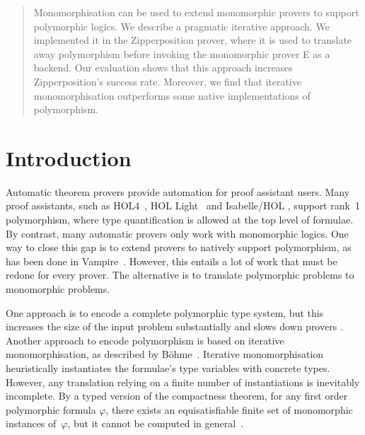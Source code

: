 \documentclass[runningheads]{llncs}
\begin{document}
\author{Tanguy Bozec \and
Jasmin Blanchette}




\maketitle

\begin{sloppy}
\begin{abstract}
Monomorphisation can be used to extend monomorphic provers to support polymorphic logics. We describe a pragmatic iterative approach. We implemented it in the Zipperposition prover, where it is used to translate away polymorphism before invoking the monomorphic prover E as a backend. Our evaluation shows that this approach increases Zipperposition's success rate. Moreover, we find that iterative monomorphisation outperforms some native implementations of polymorphism.

\end{abstract}
\end{sloppy}

\section{Introduction}

Automatic theorem provers provide automation for proof assistant users. Many proof assistants, such as HOL4~\cite{slind-norrish-2008}, HOL Light~\cite{harrison-2009} and Isabelle\slash HOL \cite{nipkow-et-al-2002}, support rank~1 polymorphism, where type quantification is allowed at the top level of formulae. By contrast, many automatic provers only work with monomorphic logics. One way to close this gap is to extend provers to natively support polymorphism, as has been done in Vampire~\cite{bhayat-reger-2020}. However, this entails a lot of work that must be redone for every prover.
%
The alternative is to translate polymorphic problems to monomorphic problems.

One approach \cite{mono-trans} is to encode a complete polymorphic type system, %
but this increases the size of the input problem substantially and slows down provers \cite{mono-trans}.
%
Another approach to encode polymorphism is based on {iterative monomorphisation}, as described by B\"ohme~\cite[Section 2.2.1]{sb-phd}.
%
Iterative monomorphisation heuristically instantiates the formulae's type variables with concrete types.
%
However, any translation relying on a finite number of instantiations is inevitably incomplete.
By a typed version of the compactness theorem, for any first order polymorphic formula \(\varphi\), there exists an equisatisfiable finite set of monomorphic instances of~\(\varphi\), but
it cannot be computed in general~\cite[Theorem~1]{expr-poly-types}.
\end{document}
